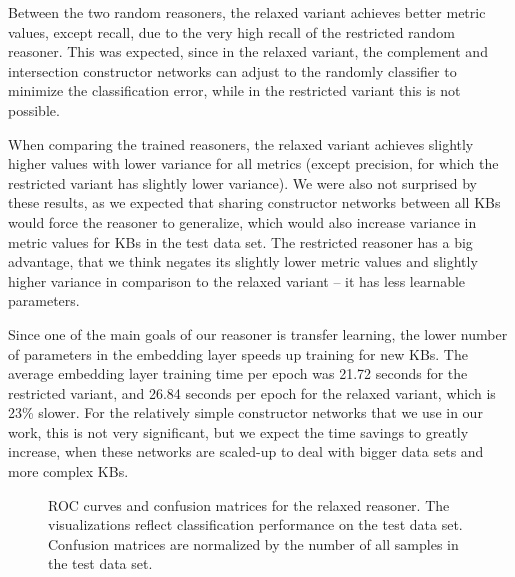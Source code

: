 Between the two random reasoners, the relaxed variant achieves better metric values, except recall, due to the very high recall of the restricted random reasoner.
This was expected, since in the relaxed variant, the complement and intersection constructor networks can adjust to the randomly classifier to minimize the classification error, while in the restricted variant this is not possible.

When comparing the trained reasoners, the relaxed variant achieves slightly higher values with lower variance for all metrics (except precision, for which the restricted variant has slightly lower variance).
We were also not surprised by these results, as we expected that sharing constructor networks between all KBs would force the reasoner to generalize, which would also increase variance in metric values for KBs in the test data set.
The restricted reasoner has a big advantage, that we think negates its slightly lower metric values and slightly higher variance in comparison to the relaxed variant -- it has less learnable parameters.

Since one of the main goals of our reasoner is transfer learning, the lower number of parameters in the embedding layer speeds up training for new KBs.
The average embedding layer training time per epoch was 21.72 seconds for the restricted variant, and 26.84 seconds per epoch for the relaxed variant, which is 23\% slower.
For the relatively simple constructor networks that we use in our work, this is not very significant, but we expect the time savings to greatly increase, when these networks are scaled-up to deal with bigger data sets and more complex KBs.

\newpage

\begin{figure}[h!]
\centering
\caption{
ROC curves and confusion matrices for the relaxed reasoner.
The visualizations reflect classification performance on the test data set.
Confusion matrices are normalized by the number of all samples in the test data set.
}
\label{fig:ex1-vs}
\end{figure}

